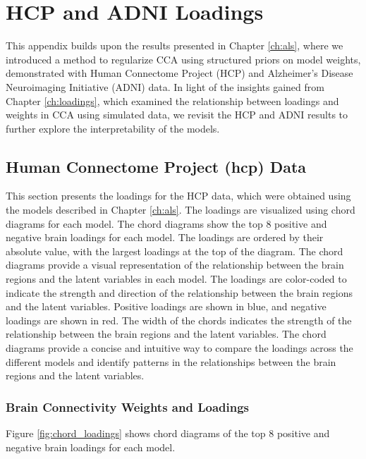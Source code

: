 \graphicspath{{chapters/loadings/}}
\chapter{HCP and ADNI Loadings}\label{appendix:loadings}

This appendix builds upon the results presented in Chapter \ref{ch:als}, where we introduced a method to regularize CCA using structured priors on model weights, demonstrated with Human Connectome Project (HCP) and Alzheimer's Disease Neuroimaging Initiative (ADNI) data. In light of the insights gained from Chapter \ref{ch:loadings}, which examined the relationship between loadings and weights in CCA using simulated data, we revisit the HCP and ADNI results to further explore the interpretability of the models.


\section{Human Connectome Project (\acrshort{hcp}) Data}

This section presents the loadings for the HCP data, which were obtained using the models described in Chapter \ref{ch:als}. The loadings are visualized using chord diagrams for each model. The chord diagrams show the top 8 positive and negative brain loadings for each model. The loadings are ordered by their absolute value, with the largest loadings at the top of the diagram. The chord diagrams provide a visual representation of the relationship between the brain regions and the latent variables in each model. The loadings are color-coded to indicate the strength and direction of the relationship between the brain regions and the latent variables. Positive loadings are shown in blue, and negative loadings are shown in red. The width of the chords indicates the strength of the relationship between the brain regions and the latent variables. The chord diagrams provide a concise and intuitive way to compare the loadings across the different models and identify patterns in the relationships between the brain regions and the latent variables.

\subsection{Brain Connectivity Weights and Loadings}

Figure \ref{fig:chord_loadings} shows chord diagrams of the top 8 positive and negative brain \gls{loadings} for each model. 

